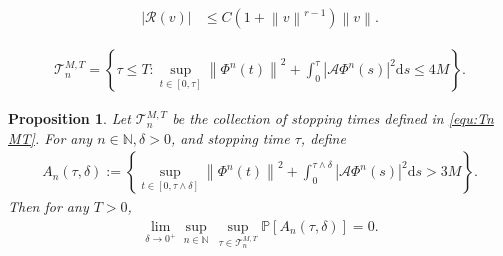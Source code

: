 \documentclass[10pt,a4paper]{amsart}
\newtheorem{proposition}{Proposition}
\newcommand{\abs}[1]{\left|{#1}\right|}
\newcommand{\bb}{\mathbb}
\newcommand{\ds}{\mathrm{d}s}
\newcommand{\norm}[1]{\left\|{#1}\right\|}
\begin{document}
    \begin{align}\label{equ:est R v in v}
		\abs{\mathcal{R}(v)}
		&\leq
		C \left(1+ \norm{v}^{r-1} \right) \norm{v}.
    \end{align}

\begin{align}\label{equ:Tn MT}
	\mathcal{T}_n^{M,T}= \left\{ \tau\leq T: \sup_{t\in [0,\tau]} \norm{\Phi^n(t)}^2 + \int_0^\tau \abs{\mathcal{A}\Phi^n(s)}^2 \ds  \leq 4M \right\}.
\end{align}

\begin{proposition}
Let $\mathcal{T}_n^{M,T}$ be the collection of stopping times defined in \eqref{equ:Tn MT}.
For any $n\in\bb{N}, \delta>0$, and stopping time $\tau$, define
\begin{align}\label{equ:event An tau}
	A_n(\tau,\delta):= \left\{ \sup_{t\in [0,\tau\wedge \delta]} \norm{\Phi^n(t)}^2 + \int_0^{\tau\wedge \delta} \abs{\mathcal{A}\Phi^n(s)}^2 \ds > 3M \right\}.
\end{align}
Then for any $T>0$,
\begin{align}\label{equ:lim sup prob}
	\lim_{\delta \to 0^+} \sup_{n\in\bb{N}}\, \sup_{\tau \in\mathcal{T}_n^{M,T}} \bb{P}\left[ A_n(\tau,\delta) \right] =0.
\end{align}
\end{proposition}
\end{document}
